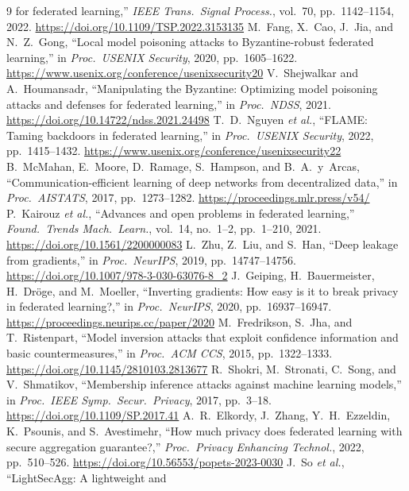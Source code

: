 \documentclass[lettersize,journal]{IEEEtran}
\begin{document}
\begin{thebibliography}{9}
for federated learning,'' \emph{IEEE Trans.\ Signal Process.}, vol.\ 70,
pp.\ 1142--1154, 2022. \url{https://doi.org/10.1109/TSP.2022.3153135}
 M.\ Fang, X.\ Cao, J.\ Jia, and N.\ Z.\ Gong, ``Local model
poisoning attacks to Byzantine-robust federated learning,'' in \emph{Proc.\ USENIX
Security}, 2020, pp.\ 1605--1622. \url{https://www.usenix.org/conference/usenixsecurity20}
 V.\ Shejwalkar and A.\ Houmansadr, ``Manipulating the
Byzantine: Optimizing model poisoning attacks and defenses for federated learning,''
in \emph{Proc.\ NDSS}, 2021. \url{https://doi.org/10.14722/ndss.2021.24498}
 T.\ D.\ Nguyen \emph{et al.}, ``FLAME: Taming backdoors in
federated learning,'' in \emph{Proc.\ USENIX Security}, 2022, pp.\ 1415--1432. \url{https://www.usenix.org/conference/usenixsecurity22}
 B.\ McMahan, E.\ Moore, D.\ Ramage, S.\ Hampson, and
B.\ A.\ y~Arcas, ``Communication-efficient learning of deep networks from
decentralized data,'' in \emph{Proc.\ AISTATS}, 2017, pp.\ 1273--1282. \url{https://proceedings.mlr.press/v54/}
 P.\ Kairouz \emph{et al.}, ``Advances and open problems in
federated learning,'' \emph{Found.\ Trends Mach.\ Learn.}, vol.\ 14, no.\ 1--2,
pp.\ 1--210, 2021. \url{https://doi.org/10.1561/2200000083}
 L.\ Zhu, Z.\ Liu, and S.\ Han, ``Deep leakage from gradients,''
in \emph{Proc.\ NeurIPS}, 2019, pp.\ 14747--14756. \url{https://doi.org/10.1007/978-3-030-63076-8_2}
 J.\ Geiping, H.\ Bauermeister, H.\ Dr\"oge, and M.\ Moeller,
``Inverting gradients: How easy is it to break privacy in federated learning?,''
in \emph{Proc.\ NeurIPS}, 2020, pp.\ 16937--16947. \url{https://proceedings.neurips.cc/paper/2020}
 M.\ Fredrikson, S.\ Jha, and T.\ Ristenpart, ``Model
inversion attacks that exploit confidence information and basic countermeasures,''
in \emph{Proc.\ ACM CCS}, 2015, pp.\ 1322--1333. \url{https://doi.org/10.1145/2810103.2813677}
 R.\ Shokri, M.\ Stronati, C.\ Song, and V.\ Shmatikov,
``Membership inference attacks against machine learning models,'' in
\emph{Proc.\ IEEE Symp.\ Secur.\ Privacy}, 2017, pp.\ 3--18. \url{https://doi.org/10.1109/SP.2017.41}
 A.\ R.\ Elkordy, J.\ Zhang, Y.\ H.\ Ezzeldin, K.\ Psounis,
and S.\ Avestimehr, ``How much privacy does federated learning with secure
aggregation guarantee?,'' \emph{Proc.\ Privacy Enhancing Technol.}, 2022,
pp.\ 510--526. \url{https://doi.org/10.56553/popets-2023-0030}
 J.\ So \emph{et al.}, ``LightSecAgg: A lightweight and

\end{thebibliography}
\end{document}
